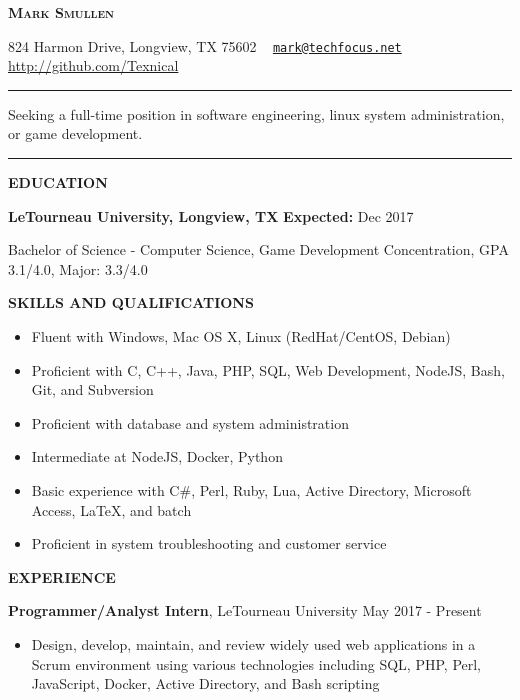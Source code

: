 \documentclass[letterpaper]{article}
\newcommand{\titlename}[1]{\centerline{\huge \bfseries{\scshape{#1}}}}
\newcommand{\contactinfo}[1]{\centerline{\small #1}}
\renewcommand{\section}[1]{\bigskip\noindent\textbf{#1}\smallskip}
\newcommand{\entry}[3]{\textbf{#1}, #2\begin{itemize}[leftmargin=3.5em]#3\end{itemize}\bigskip}
\begin{document}
\titlename{Mark Smullen}
\contactinfo{%
    824 Harmon Drive, Longview, TX 75602 \textperiodcentered \ %
    \href{mailto:mark@techfocus.net}{\nolinkurl{mark@techfocus.net}} \textperiodcentered \ %
    \url{http://github.com/Texnical} \textperiodcentered \ %
    \phonenumber[country=US]{2707911770}%
}
\vspace{2mm}
\hrule
\vspace{2mm}
\centerline{Seeking a full-time position in software engineering, linux system administration, or game development.}
\vspace{2mm}
\hrule

\section{EDUCATION}

\textbf{LeTourneau University, Longview, TX}                            \hfill          \textbf{Expected:} Dec 2017

Bachelor of Science - Computer Science, Game Development Concentration, GPA 3.1/4.0, Major: 3.3/4.0


\section{SKILLS AND QUALIFICATIONS}

\begin{multicols}{2}
\begin{itemize}[leftmargin=3.5em]
    \item Fluent with Windows, Mac OS X, Linux (RedHat/CentOS, Debian)
    \item Proficient with C, C++, Java, PHP, SQL, Web Development, NodeJS, Bash, Git, and Subversion
    \item Proficient with database and system administration
    \item Intermediate at NodeJS, Docker, Python
    \item Basic experience with C\#, Perl, Ruby, Lua, Active Directory, Microsoft Access, \LaTeX{}, and batch
    \item Proficient in system troubleshooting and customer service
\end{itemize}
\end{multicols}

\section{EXPERIENCE}

\entry{Programmer/Analyst Intern}{LeTourneau University                 \hfill          May 2017 - Present} {
    \item Design, develop, maintain, and review widely used web applications in a Scrum environment using various technologies including SQL, PHP, Perl, JavaScript, Docker, Active Directory, and Bash scripting
}
\end{document}
